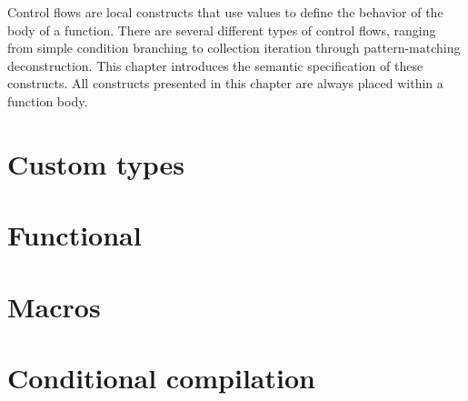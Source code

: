 \documentclass[a4paper,11pt]{book}
\begin{document}
Control flows are local constructs that use values to define the behavior of the
body of a function. There are several different types of control flows, ranging
from simple condition branching to collection iteration through pattern-matching
deconstruction. This chapter introduces the semantic specification of these
constructs. All constructs presented in this chapter are always placed within a
function body.

\begin{multicols*}{2}
  \minitoc%
  
\end{multicols*}

\chapter{Custom types}%
\label{chap:custom_types}

\begin{multicols*}{2}
  \minitoc%
  
\end{multicols*}

\chapter{Functional}
\label{chap:functional}

\begin{multicols*}{2}
  \minitoc%
  
\end{multicols*}


\chapter{Macros}
\label{chap:macros}

\begin{multicols*}{2}
  \minitoc%
\end{multicols*}


\chapter{Conditional compilation}
\label{chap:conditional_compilation}

\begin{multicols*}{2}
  \minitoc%
\end{multicols*}
\end{document}
